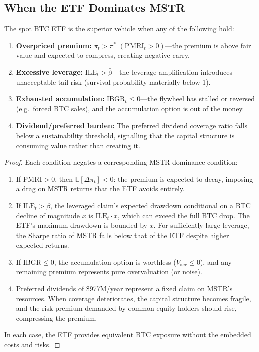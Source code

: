\subsection{When the ETF Dominates MSTR}

\begin{proposition}\label{prop:etf-dominates}
The spot BTC ETF is the superior vehicle when any of the following hold:
\begin{enumerate}
  \item \textbf{Overpriced premium:} $\pi_t > \pi^*$
    $(\mathrm{PMRI}_t > 0)$---the premium is above fair value and expected
    to compress, creating negative carry.
  \item \textbf{Excessive leverage:} $\mathrm{ILE}_t > \bar\beta$---the
    leverage amplification introduces unacceptable tail risk (survival
    probability materially below 1).
  \item \textbf{Exhausted accumulation:} $\mathrm{IBGR}_t \le 0$---the
    flywheel has stalled or reversed (e.g.\ forced BTC sales), and
    the accumulation option is out of the money.
  \item \textbf{Dividend/preferred burden:} The preferred dividend
    coverage ratio falls below a sustainability threshold, signalling
    that the capital structure is consuming value rather than creating it.
\end{enumerate}
\end{proposition}

\begin{proof}
Each condition negates a corresponding MSTR dominance condition:
\begin{enumerate}
  \item If $\mathrm{PMRI} > 0$, then $\mathbb{E}[\Delta\pi_t] < 0$:
    the premium is expected to decay, imposing a drag on MSTR returns
    that the ETF avoids entirely.

  \item If $\mathrm{ILE}_t > \bar\beta$, the leveraged claim's expected
    drawdown conditional on a BTC decline of magnitude $x$ is
    $\mathrm{ILE}_t \cdot x$, which can exceed the full BTC drop.
    The ETF's maximum drawdown is bounded by $x$.  For sufficiently
    large leverage, the Sharpe ratio of MSTR falls below that of the ETF
    despite higher expected returns.

  \item If $\mathrm{IBGR} \le 0$, the accumulation option is worthless
    ($V_{\mathrm{acc}} \le 0$), and any remaining premium represents
    pure overvaluation (or noise).

  \item Preferred dividends of \$977M/year represent a fixed claim on
    MSTR's resources.  When coverage deteriorates, the capital structure
    becomes fragile, and the risk premium demanded by common equity
    holders should rise, compressing the premium.
\end{enumerate}
In each case, the ETF provides equivalent BTC exposure without the
embedded costs and risks.
\end{proof}

